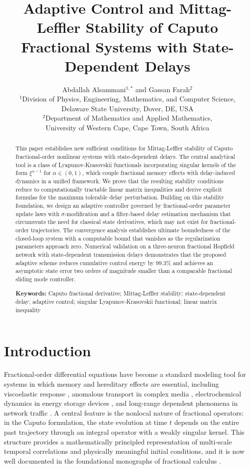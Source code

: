 \documentclass[12pt,a4paper]{article}
\title{\Large Adaptive Control and Mittag-Leffler Stability of Caputo Fractional Systems with State-Dependent Delays}
\author{
    Abdallah Alsammani$^{1,*}$ and Gassan Farah$^{2}$\\[0.8em]
\small $^{1}$Division of Physics, Engineering, Mathematics, and Computer Science, \\
\small Delaware State University, Dover, DE, USA \\[0.3em]
\small $^{2}$Department of Mathematics and Applied Mathematics,\\
\small University of Western Cape, Cape Town, South Africa
}
\date{}
\begin{document}
\maketitle
\thispagestyle{firstpage}



\begin{abstract}
This paper establishes new sufficient conditions for Mittag-Leffler stability of Caputo fractional-order nonlinear systems with state-dependent delays. The central analytical tool is a class of Lyapunov-Krasovskii functionals incorporating singular kernels of the form $\xi^{\alpha-1}$ for $\alpha \in (0,1)$, which couple fractional memory effects with delay-induced dynamics in a unified framework. We prove that the resulting stability conditions reduce to computationally tractable linear matrix inequalities and derive explicit formulas for the maximum tolerable delay perturbation. Building on this stability foundation, we design an adaptive controller governed by fractional-order parameter update laws with $\sigma$-modification and a filter-based delay estimation mechanism that circumvents the need for classical state derivatives, which may not exist for fractional-order trajectories. The convergence analysis establishes ultimate boundedness of the closed-loop system with a computable bound that vanishes as the regularization parameters approach zero. Numerical validation on a three-neuron fractional Hopfield network with state-dependent transmission delays demonstrates that the proposed adaptive scheme reduces cumulative control energy by 99.3\% and achieves an asymptotic state error two orders of magnitude smaller than a comparable fractional sliding mode controller.

\medskip
\noindent\textbf{Keywords:} Caputo fractional derivative; Mittag-Leffler stability; state-dependent delay; adaptive control; singular Lyapunov-Krasovskii functional; linear matrix inequality
\end{abstract}

\section{Introduction}

Fractional-order differential equations have become a standard modeling tool for systems in which memory and hereditary effects are essential, including viscoelastic response \cite{mainardi2010}, anomalous transport in complex media \cite{metzler2000}, electrochemical dynamics in energy storage devices \cite{sabatier2015}, and long-range dependent phenomena in network traffic \cite{sun2018}. A central feature is the nonlocal nature of fractional operators: in the Caputo formulation, the state evolution at time $t$ depends on the entire past trajectory through an integral operator with a weakly singular kernel. This structure provides a mathematically principled representation of multi-scale temporal correlations and physically meaningful initial conditions, and it is now well documented in the foundational monographs of fractional calculus \cite{podlubny1999,kilbas2006}.
\end{document}
